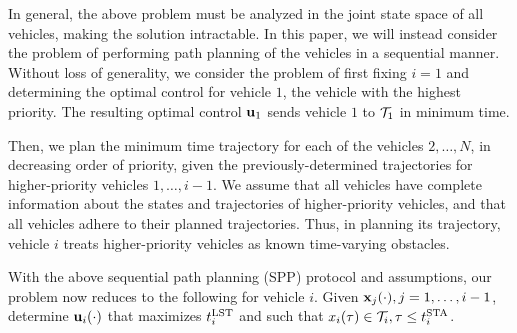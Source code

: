 In general, the above problem must be analyzed in the joint state space of all vehicles, making the solution intractable. In this paper, we will instead consider the problem of performing path planning of the vehicles in a sequential manner. Without loss of generality, we consider the problem of first fixing $i=1$ and determining the optimal control for vehicle $1$, the vehicle with the highest priority. The resulting optimal control $\mathbf{u}_1$ sends vehicle $1$ to $\mathcal{T}_1$ in minimum time. 

Then, we plan the minimum time trajectory for each of the vehicles $2,\ldots,N$, in decreasing order of priority, given the previously-determined trajectories for higher-priority vehicles $1,\ldots,i-1$. We assume that all vehicles have complete information about the states and trajectories of higher-priority vehicles, and that all vehicles adhere to their planned trajectories. Thus, in planning its trajectory, vehicle $i$ treats higher-priority vehicles as known time-varying obstacles. 

With the above sequential path planning (SPP) protocol and assumptions, our problem now reduces to the following for vehicle $i$. Given $\mathbf{x}_j(\cdot), j=1,\ldots,i-1$, determine $\mathbf{u}_i(\cdot)$ that maximizes $t^{\text{LST}}_i$ and such that $x_i(\tau) \in \mathcal{T}_i, \tau\le t^{\text{STA}}_i$.